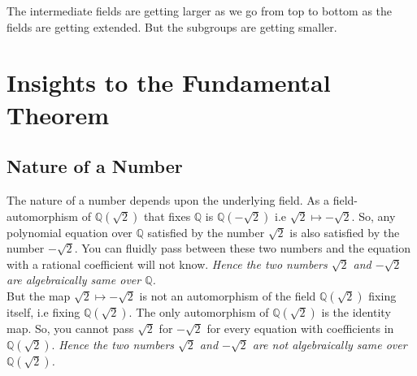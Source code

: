 \vspace{5mm}
\begin{remark}
  The intermediate fields are getting larger as we go from top to bottom  as the fields are getting extended. But the subgroups are getting smaller.
\end{remark}

\vspace{7mm}
\section{Insights to the Fundamental Theorem}

\subsection{Nature of a Number}
The nature of a number depends upon the underlying field. As a field-automorphism of  \(\mathbb{Q}(\sqrt{2})\) that fixes \(\mathbb{Q}\) is \(\mathbb{Q}(-\sqrt{2})\) i.e \(\sqrt{2} \longmapsto -\sqrt{2}\). So,  any polynomial equation over \(\mathbb{Q}\) satisfied by the number \(\sqrt{2}\) is also satisfied by the number \(-\sqrt{2}\). You can fluidly pass between these two numbers and the equation with a rational coefficient will not know. \textit{Hence the two numbers \(\sqrt{2}\) and \(-\sqrt{2}\) are algebraically same over \(\mathbb{Q}\).}\\

But the map \(\sqrt{2} \longmapsto -\sqrt{2}\) is not an automorphism of the field \(\mathbb{Q}(\sqrt{2})\) fixing itself, i.e fixing \(\mathbb{Q}(\sqrt{2})\). The only automorphism of \(\mathbb{Q}(\sqrt{2})\) is the identity map. So, you cannot pass \(\sqrt{2}\) for \(-\sqrt{2}\) for every equation with coefficients in \(\mathbb{Q}(\sqrt{2})\). \textit{Hence the two numbers \(\sqrt{2}\) and \(-\sqrt{2}\) are not algebraically same over \(\mathbb{Q}(\sqrt{2})\).}
\vspace{7mm}

\begin{figure}[h]
  \centering
    \end{figure}
\clearpage

